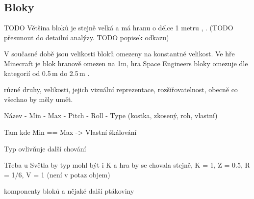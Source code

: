 
\subsection{Bloky}

TODO  Většina bloků je stejně velká a má hranu o délce 1 metru \citep{mc_block}, \citep{mc_units}. (TODO přesunout do detailní analýzy. TODO popisek odkazu)

V současné době jsou velikosti bloků omezeny na konstantné velikost. Ve hře Minecraft je blok hranově omezen na 1m, hra Space Engineers bloky omezuje dle kategorií od 0.5\,\rm m do 2.5\,\rm m \citep{se_blocks_wiki}.


různé druhy, velikosti, jejich vizuální reprezentace, rozšiřovatelnost, obecně co všechno by měly umět.

Název - Min - Max - Pitch - Roll - Type (kostka, zkosený, roh, vlastní)

Tam kde Min == Max -> Vlastní škálování

Typ ovlivňuje další chování

Třeba u Světla by typ mohl být i K a hra by se chovala stejně, K = 1, Z = 0.5, R = 1/6, V = 1 (není v potaz objem)

komponenty bloků a nějaké další ptákoviny

